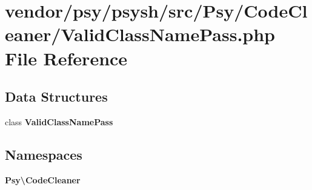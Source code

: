 \section{vendor/psy/psysh/src/\+Psy/\+Code\+Cleaner/\+Valid\+Class\+Name\+Pass.php File Reference}
\label{_valid_class_name_pass_8php}
\subsection*{Data Structures}
\begin{DoxyCompactItemize}
\item 
class {\bf Valid\+Class\+Name\+Pass}
\end{DoxyCompactItemize}
\subsection*{Namespaces}
\begin{DoxyCompactItemize}
\item 
 {\bf Psy\textbackslash{}\+Code\+Cleaner}
\end{DoxyCompactItemize}
